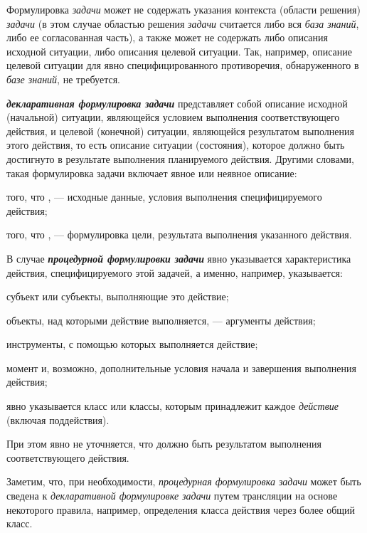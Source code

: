 Формулировка \textit{задачи} может не содержать указания контекста (области решения) \textit{задачи} (в этом случае областью решения \textit{задачи} считается либо вся \textit{база знаний}, либо ее согласованная часть), а также может не содержать либо описания исходной ситуации, либо описания целевой ситуации. Так, например, описание целевой ситуации для явно специфицированного противоречия, обнаруженного в \textit{базе знаний}, не требуется.

\textbf{\textit{декларативная формулировка задачи}} представляет собой описание исходной (начальной) ситуации, являющейся условием выполнения соответствующего действия, и целевой (конечной) ситуации, являющейся результатом выполнения этого действия, то есть описание ситуации (состояния), которое должно быть достигнуто в результате выполнения планируемого действия. Другими словами, такая формулировка задачи включает явное или неявное описание:
\begin{textitemize}
	\item того, что , --- исходные данные, условия выполнения специфицируемого действия;
	\item того, что , --- формулировка цели, результата выполнения указанного действия.
\end{textitemize}

В случае \textbf{\textit{процедурной формулировки задачи}} явно указывается характеристика действия, специфицируемого этой задачей, а именно, например, указывается:
\begin{textitemize}
	\item субъект или субъекты, выполняющие это действие;
	\item объекты, над которыми действие выполняется, --- аргументы действия;
	\item инструменты, с помощью которых выполняется действие;
	\item момент и, возможно, дополнительные условия начала и завершения выполнения действия;
	\item явно указывается класс или классы, которым принадлежит каждое \textit{действие} (включая поддействия).
\end{textitemize}

При этом явно не уточняется, что должно быть результатом выполнения соответствующего действия.

Заметим, что, при необходимости, \textit{процедурная формулировка задачи} может быть сведена к \textit{декларативной формулировке задачи} путем трансляции на основе некоторого правила, например, определения класса действия через более общий класс.


